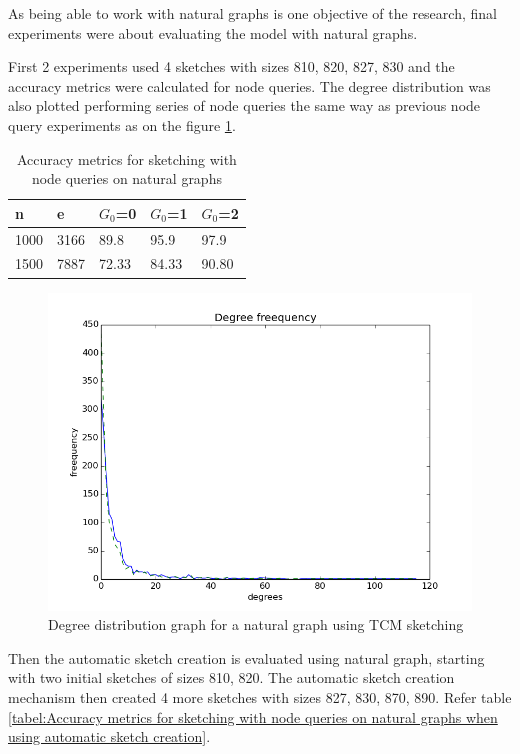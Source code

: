 \documentclass[conference]{IEEEtran}
\begin{document}
As being able to work with natural graphs is one objective of the research, final experiments were  about evaluating the model with natural graphs. 


First 2 experiments used 4 sketches with sizes 810, 820, 827, 830 and the accuracy metrics were calculated for node queries. The degree distribution was also plotted performing series of node queries the same way as previous node query experiments as on the figure \ref{fig:Degree distribution graph fora natural graph using TCM sketching}.


\begin{table}[!b]
\caption{Accuracy metrics for sketching with node queries on natural graphs}
\centering
\begin{tabular}{|l|l|l|l|l|}
\hline
n    & e     & $G_0$=0 & $G_0$=1 & $G_0$=2 \\ \hline
1000 & 3166  & 89.8   & 95.9  & 97.9  \\ \hline
1500 & 7887 & 72.33   & 84.33   & 90.80  \\ \hline
\end{tabular}
\end{table}


\begin{figure}[!t]
\centering
\includegraphics[width=\linewidth]{GenForestFire-1000-035-035-n1500-e7887-sketches-810-820-827-830plot}
\caption{Degree distribution graph for a natural graph using TCM sketching}
\label{fig:Degree distribution graph fora natural graph using TCM sketching}
\end{figure}

Then the automatic sketch creation is evaluated using natural graph, starting with two initial sketches of sizes 810, 820. The automatic sketch creation mechanism then created 4 more sketches with sizes 827, 830, 870, 890. Refer table \ref{tabel:Accuracy metrics for sketching with node queries on natural graphs when using automatic sketch creation}.
\end{document}
